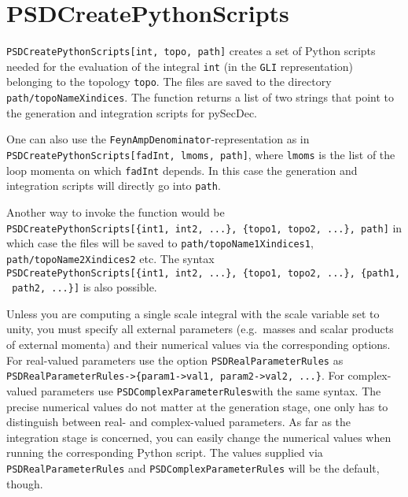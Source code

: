 \documentclass[../FeynHelpersManual.tex]{subfiles}
\begin{document}
\hypertarget{psdcreatepythonscripts}{
\section{PSDCreatePythonScripts}\label{psdcreatepythonscripts}}

\texttt{PSDCreatePythonScripts[\allowbreak{}int,\ \allowbreak{}topo,\ \allowbreak{}path]}
creates a set of Python scripts needed for the evaluation of the
integral \texttt{int} (in the \texttt{GLI} representation) belonging to
the topology \texttt{topo}. The files are saved to the directory
\texttt{path/topoNameXindices}. The function returns a list of two
strings that point to the generation and integration scripts for
pySecDec.

One can also use the \texttt{FeynAmpDenominator}-representation as in
\texttt{PSDCreatePythonScripts[\allowbreak{}fadInt,\ \allowbreak{}lmoms,\ \allowbreak{}path]},
where \texttt{lmoms} is the list of the loop momenta on which
\texttt{fadInt} depends. In this case the generation and integration
scripts will directly go into \texttt{path}.

Another way to invoke the function would be
\texttt{PSDCreatePythonScripts[\allowbreak{}\{\allowbreak{}int1,\ \allowbreak{}int2,\ \allowbreak{}...\},\ \allowbreak{}\{\allowbreak{}topo1,\ \allowbreak{}topo2,\ \allowbreak{}...\},\ \allowbreak{}path]}
in which case the files will be saved to
\texttt{path/topoName1Xindices1}, \texttt{path/topoName2Xindices2} etc.
The syntax
\texttt{PSDCreatePythonScripts[\allowbreak{}\{\allowbreak{}int1,\ \allowbreak{}int2,\ \allowbreak{}...\},\ \allowbreak{}\{\allowbreak{}topo1,\ \allowbreak{}topo2,\ \allowbreak{}...\},\ \allowbreak{}\{\allowbreak{}path1,\ \allowbreak{}path2,\ \allowbreak{}...\}]}
is also possible.

Unless you are computing a single scale integral with the scale variable
set to unity, you must specify all external parameters (e.g.~masses and
scalar products of external momenta) and their numerical values via the
corresponding options. For real-valued parameters use the option
\texttt{PSDRealParameterRules} as
\texttt{PSDRealParameterRules->\{\allowbreak{}param1->val1,\ \allowbreak{}param2->val2,\ \allowbreak{}...\}}.
For complex-valued parameters use \texttt{PSDComplexParameterRules}with
the same syntax. The precise numerical values do not matter at the
generation stage, one only has to distinguish between real- and
complex-valued parameters. As far as the integration stage is concerned,
you can easily change the numerical values when running the
corresponding Python script. The values supplied via
\texttt{PSDRealParameterRules} and \texttt{PSDComplexParameterRules}
will be the default, though.
\end{document}
